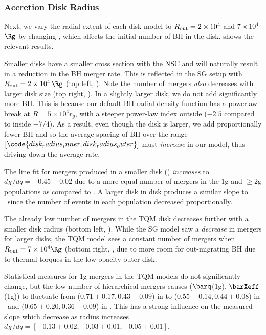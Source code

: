 \subsubsection{Accretion Disk Radius}
Next, we vary the radial extent of each disk model to $R_{\rm out}=2\times10^4$ and $7\times10^4$ $\Rg$ by changing , which affects the initial number of BH in the disk.
 shows the relevant results.

Smaller disks have a smaller cross section with the NSC and will naturally result in a reduction in the BH merger rate.
This is reflected in the SG setup with $R_{\rm out} = 2\times10^4\,\Rg$ (top left, ).
Note the number of mergers \emph{also} decreases with larger disk size (top right, ).
In a slightly larger disk, we do not add significantly more BH.
This is because our default BH radial density function has a powerlaw break at $R=5 \times 10^{4}r_{g}$, with a steeper power-law index outside ($-2.5$ compared to inside $-7/4$).
As a result, even though the disk is larger, we add proportionally fewer BH and so the average spacing of BH over the range $[\code{disk_radius_inner, disk_radius_outer}]$ must \emph{increase} in our model, thus driving down the average rate.

The line fit for mergers produced in a smaller disk () \emph{increases} to $d\chi/dq=-0.45\pm0.02$ due to a more equal number of mergers in the 1g and $\geq$2g populations as compared to \sgdefault.
A larger disk in  disk produces a similar slope to \sgdefault\ since the number of events in each population decreased proportionally.

The already low number of mergers in the TQM disk decreases further with a smaller disk radius (bottom left, ).
While the SG model saw a \emph{decrease} in mergers for larger disks, the TQM model sees a constant number of mergers when $R_{\rm out}=7\times10^4\Rg$ (bottom right, , due to more room for out-migrating BH due to thermal torques in the low opacity outer disk.

Statistical measures for 1g mergers in the TQM models do not significantly change, but the low number of hierarchical mergers causes ($\barq$(1g), $\barXeff$(1g)) to fluctuate from ($0.71\pm0.17, 0.43\pm0.09$) in  to ($0.55\pm0.14, 0.44\pm0.08$) in \tqmdefault\ and ($0.65\pm0.20, 0.36\pm0.09$) in .
This has a strong influence on the measured slope which decrease as radius increases $d\chi/dq=[-0.13\pm0.02, -0.03\pm0.01, -0.05\pm0.01]$.


